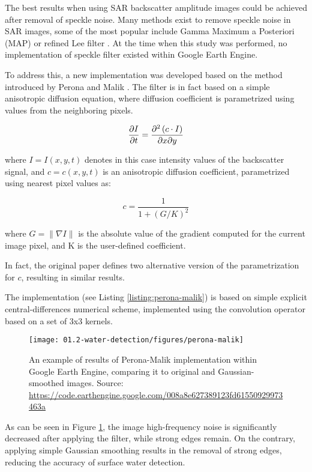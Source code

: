The best results when using SAR backscatter amplitude images could be achieved after removal of speckle noise. Many methods exist to remove speckle noise in SAR images, some of the most popular include Gamma Maximum a Posteriori (MAP) \citep{lopes1990maximum} or refined Lee filter \citep{lee1981speckle}. At the time when this study was performed, no implementation of speckle filter existed within Google Earth Engine. 

To address this, a new implementation was developed based on the method introduced by Perona and Malik \citep{perona1990scale}. The filter is in fact based on a simple anisotropic diffusion equation, where diffusion coefficient is parametrized using values from the neighboring pixels. 

\begin{equation}
\pdv{I}{t} = \pdv[2]{ \left(c \cdot I\right)}{x}{y}
\end{equation}

where $I=I(x,y,t)$ denotes in this case intensity values of the backscatter signal, and $c=c(x,y,t)$ is an anisotropic diffusion coefficient, parametrized using nearest pixel values as:

\begin{equation}
c = \frac{1}{1 + \left(G/K\right)^2}
\end{equation}

where $G = \| \nabla I\|$ is the absolute value of the gradient computed for the current image pixel, and K is the user-defined coefficient.

In fact, the original paper defines two alternative version of the parametrization for $c$, resulting in similar results.


The implementation (see Listing \ref{listing:perona-malik}) is based on simple explicit central-differences numerical scheme, implemented using the convolution operator based on a set of 3x3 kernels. 

\begin{figure}[H]
	\texttt{[image: 01.2-water-detection/figures/perona-malik]}
	\caption{An example of results of Perona-Malik implementation within Google Earth Engine, comparing it to original and Gaussian-smoothed images. Source: \url{https://code.earthengine.google.com/008a8e627389123fd61550929973463a}}
	\label{fig:perona-malik}
\end{figure}

As can be seen in Figure \ref{fig:perona-malik}, the image high-frequency noise is significantly decreased after applying the filter, while strong edges remain. On the contrary, applying simple Gaussian smoothing results in the removal of strong edges, reducing the accuracy of surface water detection.

